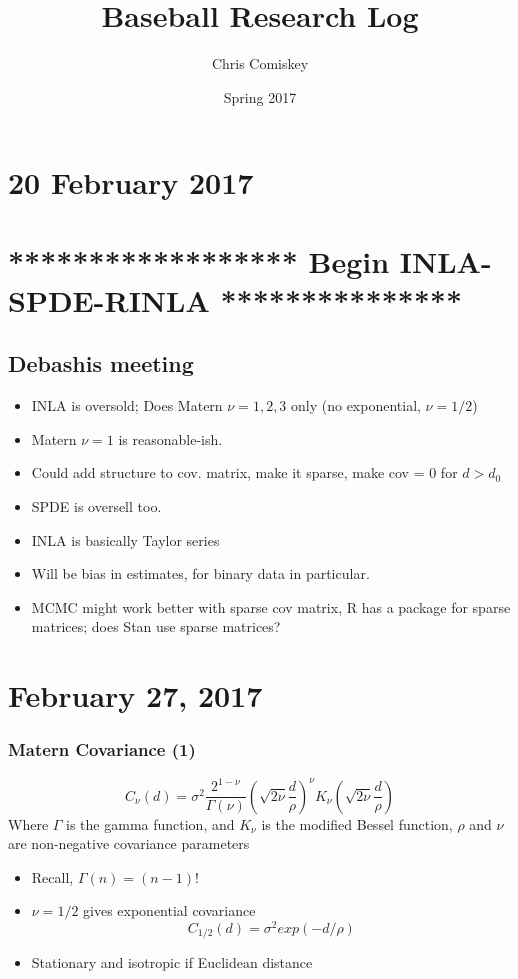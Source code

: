 \documentclass{article}
\title{Baseball Research Log}
\author{Chris Comiskey}
\date{Spring 2017}
\begin{document}
\maketitle{}

\section*{20 February 2017}

\section*{****************** Begin INLA-SPDE-RINLA ***************}

\subsection*{Debashis meeting}
\begin{itemize}
\item INLA is oversold; Does Matern $\nu = 1, 2, 3$ only (no exponential, $\nu = 1/2$)
\item Matern $\nu = 1$ is reasonable-ish.
\item Could add structure to cov. matrix, make it sparse, make cov = 0 for $d > d_{0}$
\item SPDE is oversell too.
\item INLA is basically Taylor series
\item Will be bias in estimates, for binary data in particular.
\item MCMC might work better with sparse cov matrix, R has a package for sparse matrices; does Stan use sparse matrices?
\end{itemize}

\section*{February 27, 2017}

\subsubsection*{Matern Covariance (1)}
$$ C_{\nu}(d) = \sigma^{2} \frac{2^{1 - \nu}}{\Gamma(\nu)} \left( \sqrt{2 \nu} \frac{d}{\rho} \right)^{\nu} K_{\nu} \left( \sqrt{2\nu}\frac{d}{\rho} \right) $$
Where $\Gamma$ is the gamma function, and $K_{\nu}$ is the modified Bessel function, $\rho$ and $\nu$ are non-negative covariance parameters
\begin{itemize}
\item Recall, $\Gamma(n) = (n-1)!$
\item $\nu = 1/2$ gives exponential covariance 
$$C_{1/2}(d) = \sigma^{2} exp(-d/\rho)$$
\item Stationary and isotropic if Euclidean distance
\end{itemize}
\end{document}
